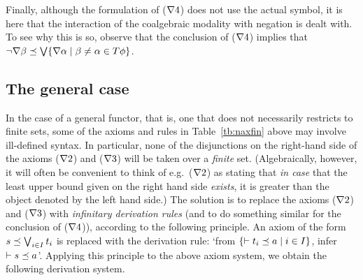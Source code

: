 \documentclass{book}
\begin{document}
Finally, although the formulation of ($\nabla4$) does not use the
actual symbol, it is here that the interaction of the coalgebraic
modality with negation is dealt with.  To see why this is so, observe
that the conclusion of ($\nabla4$) implies that $\neg \nabla\beta
\preceq \bigvee \{ \nabla\alpha \mid \beta \neq \alpha \in
T\phi \}$.

\subsection*{The general case}

In the case of a general functor, that is, one that does not
necessarily restricts to finite sets, some of the axioms and rules in
Table~\ref{tb:naxfin} above may involve ill-defined syntax.  In
particular, none of the disjunctions on the right-hand side of the
axioms ($\nabla2$) and ($\nabla3$) will be taken over a \emph{finite} set.
(Algebraically, however, it will often be convenient to think of e.g.\
($\nabla2$) as stating that \emph{in case} that the least upper bound
given on the right hand side \emph{exists}, it is greater than the
object denoted by the left hand side.)  The solution is to replace the
axioms ($\nabla2$) and ($\nabla3$) with \emph{infinitary derivation rules}
(and to do something similar for the conclusion of ($\nabla4$)),
according to the following principle.  An axiom of the form $s \preceq
\bigvee_{i\in I} t_{i}$ is replaced with the derivation rule: `from $\{
\vdash t_{i} \preceq a \mid i \in I \}$, infer $\vdash s \preceq a$'.
Applying this principle to the above axiom system, we obtain the
following derivation system.
\end{document}
